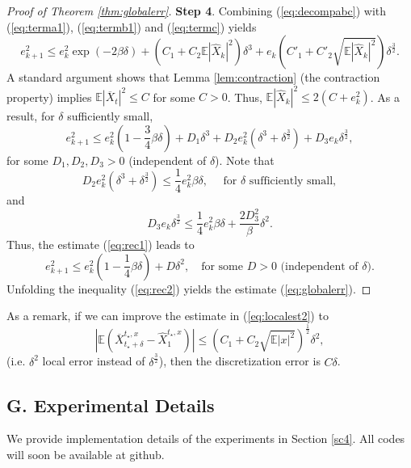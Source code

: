 \documentclass[letterpaper,10pt,reqno]{amsart}
\def\eqref#1{(\ref{#1})}
\numberwithin{equation}{section}
\begin{document}
\begin{proof}[Proof of Theorem \ref{thm:globalerr}]
{\bf Step 4}. Combining \eqref{eq:decompabc} with \eqref{eq:terma1}, \eqref{eq:termb1} and \eqref{eq:termc} yields
\begin{equation*}
e_{k+1}^2 \le e_k^2 \exp(- 2 \beta \delta) + \left( C_1 + C_2 \mathbb{E}|\widehat{X}_k|^2 \right) \delta^3 + e_k \left(C'_1 + C'_2 \sqrt{\mathbb{E}|\widehat{X}_k|^2} \right) \delta^{\frac{3}{2}}.
\end{equation*}
A standard argument shows that Lemma \ref{lem:contraction} (the contraction property) implies
$\mathbb{E}|\overline{X}_t|^2 \le C$ for some $C > 0$.
Thus, $\mathbb{E}|\widehat{X}_k|^2 \le 2(C + e_k^2)$.
As a result, for $\delta$ sufficiently small,
\begin{equation}
\label{eq:rec1}
e_{k+1}^2 \le e_k^2\left(1 - \frac{3}{4} \beta \delta \right)
+ D_1 \delta^3 + D_2 e_k^2 \left(\delta^3 + \delta^{\frac{3}{2}} \right)  + D_3 e_k \delta^{\frac{3}{2}},
\end{equation}
for some $D_1, D_2, D_3> 0$ (independent of $\delta$).
Note that 
\begin{equation*}
D_2 e_k^2 \left(\delta^3 + \delta^{\frac{3}{2}} \right) \le \frac{1}{4} e_k^2 \beta \delta, \quad \mbox{ for } \delta \mbox{ sufficiently small},
\end{equation*}
and 
\begin{equation*}
D_3 e_k \delta^{\frac{3}{2}} \le \frac{1}{4}e_k^2 \beta \delta + \frac{2 D^{2}_3}{\beta} \delta^2.
\end{equation*}
Thus, the estimate \eqref{eq:rec1} leads to
\begin{equation}
\label{eq:rec2}
e_{k+1}^2 \le e_k^2 \left(1 - \frac{1}{4} \beta \delta \right) + D \delta^2, \quad 
\mbox{for some } D > 0 \mbox{ (independent of } \delta).
\end{equation}
Unfolding the inequality \eqref{eq:rec2} yields
the estimate \eqref{eq:globalerr}.
\end{proof}

\quad As a remark, if we can improve the estimate in \eqref{eq:localest2} to
\begin{equation}
|\mathbb{E}(\overline{X}^{t_\star, x}_{t_{\star} + \delta} -\widehat{X}^{t_\star, x}_1)|
\le (C_1 + C_2 \sqrt{\mathbb{E}|x|^2} )^{\frac{1}{2}} \delta^{2},
\end{equation} 
(i.e. $\delta^2$ local error instead of $\delta^{\frac{3}{2}}$),
then the discretization error is $C \delta$.

\subsection*{G. Experimental Details}
We provide implementation details of the experiments in Section \ref{sc4}. 
All codes will soon be available at github.
\end{document}
